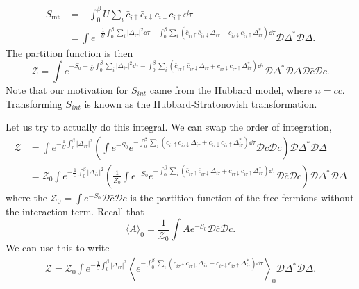 \documentclass{article}
\numberwithin{equation}{section}
\begin{document}
\begin{align}
    S_\text{int} &= - \int_0^\beta U\sum_i \bar{c}_{i\uparrow}\bar{c}_{i\downarrow}c_{i\downarrow}c_{i\uparrow} \dd{\tau} \\ 
    &= \int e^{-\frac{1}{U}\int_0^\beta \sum_i |\Delta_{i\tau}|^2 \dd{\tau} - \int_0^\beta \sum_i(\bar{c}_{i\tau\uparrow}\bar{c}_{i\tau\downarrow}\Delta_{i\tau} + c_{i\tau\downarrow}c_{i\tau \uparrow}\Delta^*_{i\tau}) \dd{\tau}} \mathcal{D}\Delta^*\mathcal{D}\Delta.
\end{align}
The partition function is then 
\begin{equation}
    \mathcal{Z} = \int e^{-S_0-\frac{1}{U}\int_0^\beta \sum_i |\Delta_{i\tau}|^2 \dd{\tau} - \int_0^\beta \sum_i(\bar{c}_{i\tau\uparrow}\bar{c}_{i\tau\downarrow}\Delta_{i\tau} + c_{i\tau\downarrow}c_{i\tau \uparrow}\Delta^*_{i\tau}) \dd{\tau}}\mathcal{D}\Delta^*\mathcal{D}\Delta\mathcal{D}\bar{c}\mathcal{D}c.
\end{equation}
Note that our motivation for $S_{int}$ came from the Hubbard model, where $n=\bar{c}c.$ Transforming $S_{int}$ is known as the Hubbard-Stratonovish transformation.
\vspace{2mm}

Let us try to actually do this integral. We can swap the order of integration,
\begin{align}
    \mathcal{Z} &= \int e^{-\frac{1}{U}\int_0^\beta |\Delta_{i\tau}|^2}\left(\int e^{-S_0}e^{-\int_0^\beta \sum_i(\bar{c}_{i\tau\uparrow}\bar{c}_{i\tau\downarrow}\Delta_{i\tau} + c_{i\tau\downarrow}c_{i\tau \uparrow}\Delta^*_{i\tau}) \dd{\tau}} \mathcal{D}\bar{c}\mathcal{D}c\right)\mathcal{D}\Delta^*\mathcal{D}\Delta \\ 
    &= {\mathcal{Z}_0}\int e^{-\frac{1}{U}\int_0^\beta |\Delta_{i\tau}|^2}\left(\frac{1}{Z_0}\int e^{-S_0}e^{-\int_0^\beta \sum_i(\bar{c}_{i\tau\uparrow}\bar{c}_{i\tau\downarrow}\Delta_{i\tau} + c_{i\tau\downarrow}c_{i\tau \uparrow}\Delta^*_{i\tau}) \dd{\tau}} \mathcal{D}\bar{c}\mathcal{D}c\right)\mathcal{D}\Delta^*\mathcal{D}\Delta
\end{align}
where the $\mathcal{Z}_0 = \int e^{-S_0} \mathcal{D}\bar{c}\mathcal{D}c$ is the partition function of the free fermions without the interaction term. Recall that
\begin{equation}
    \langle A\rangle_0 = \frac{1}{\mathcal{Z}_0}\int Ae^{-S_0}\mathcal{D}\bar{c}\mathcal{D}c.
\end{equation}
We can use this to write 
\begin{align}
    \mathcal{Z} = \mathcal{Z}_0\int e^{-\frac{1}{U}\int_0^\beta |\Delta_{i\tau}|^2} \left\langle e^{-\int_0^\beta \sum_i(\bar{c}_{i\tau\uparrow}\bar{c}_{i\tau\downarrow}\Delta_{i\tau} + c_{i\tau\downarrow}c_{i\tau \uparrow}\Delta^*_{i\tau}) \dd{\tau}}  \right\rangle_0 \mathcal{D}\Delta^*\mathcal{D}\Delta.
\end{align}
\end{document}
